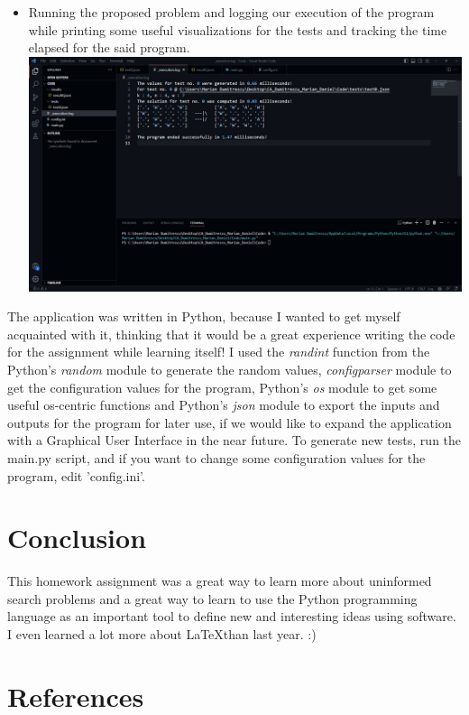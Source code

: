 \documentclass[12pt]{article}
\begin{document}
\begin{itemize}
    \item Running the proposed problem and logging our execution of the program while printing some useful visualizations for the tests and tracking the time elapsed for the said program.\newline
    \includegraphics[width=\textwidth]{program_logging.jpg}
\vfill
\end{itemize}
The application was written in Python, because I wanted to get myself acquainted with it, thinking that it would be a great experience writing the code for the assignment while learning itself!\newline
I used the \textit{randint} function from the Python's \textit{random} module to generate the random values, \textit{configparser} module to get the configuration values for the program, Python's \textit{os} module to get some useful os-centric functions and Python's \textit{json} module to export the inputs and outputs for the program for later use, if we would like to expand the application with a Graphical User Interface in the near future.
To generate new tests, run the main.py script, and if you want to change some configuration values for the program, edit 'config.ini'.
\vfill
\section{Conclusion}
This homework assignment was a great way to learn more about uninformed search problems and a great way to learn to use the Python programming language as an important tool to define new and interesting ideas using software. I even learned a lot more about \LaTeX than last year. :)
\vfill
\section{References}
\end{document}
